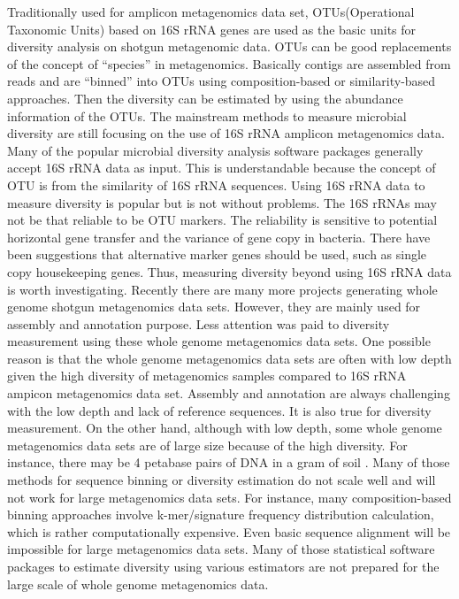 \documentclass{article}
\begin{document}
Traditionally used for amplicon metagenomics data set, OTUs(Operational
Taxonomic Units) based on 16S rRNA genes are used as the basic units for
diversity analysis on shotgun metagenomic data. OTUs can be good replacements
of the concept of ``species'' in metagenomics. Basically contigs are assembled
from reads and are ``binned'' into OTUs using composition-based or
similarity-based approaches. Then the diversity can be estimated by using the
abundance information of the OTUs. The mainstream methods to measure microbial
diversity are still focusing on the use of 16S rRNA amplicon metagenomics data.
Many of the popular microbial diversity analysis software packages generally
accept 16S rRNA data as input. This is understandable because the concept of
OTU is from the similarity of 16S rRNA sequences. Using 16S rRNA data to
measure diversity is popular but is not without problems. The 16S rRNAs may not be
that reliable to be OTU markers. The reliability is sensitive to potential
horizontal gene transfer and the variance of gene copy in bacteria. There have
been suggestions that alternative marker genes should be used, such as single
copy housekeeping genes. Thus, measuring diversity beyond using 16S rRNA data is 
worth investigating.
% 
Recently there are many more projects generating whole genome shotgun
metagenomics data sets. However, they are mainly used for assembly and
annotation purpose. Less attention was paid to diversity measurement using
these whole genome metagenomics data sets. One possible reason is that the
whole genome metagenomics data sets are often with low depth given the high
diversity of metagenomics samples compared to 16S rRNA ampicon metagenomics
data set. Assembly and annotation are always challenging with the low depth and
lack of reference sequences. It is also true for diversity measurement. On the
other hand, although with low depth, some whole genome metagenomics data sets
are of large size because of the high diversity. For instance, there may be 4
petabase pairs of DNA in a gram of soil \cite{Zarraonaindia:2013aa}. Many of
those methods for sequence binning or diversity estimation do not scale well
and will not work for large metagenomics data sets. For instance, many
composition-based binning approaches involve k-mer/signature frequency
distribution calculation, which is rather computationally expensive. Even basic
sequence alignment will be impossible for large metagenomics data sets. Many of
those statistical software packages to estimate diversity using various
estimators are not prepared for the large scale of whole genome metagenomics
data.
\end{document}
